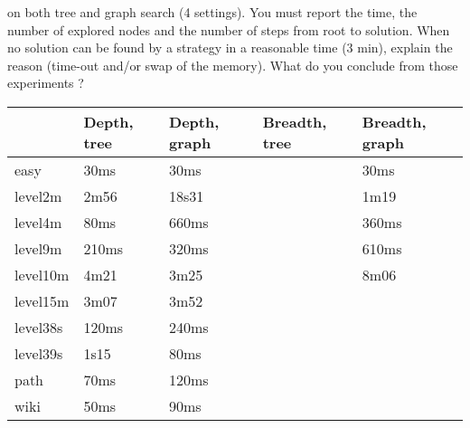 \begin{enumerate}
        on both tree and graph search (4 settings). You must report the
        time, the number of explored nodes and the number of steps from
        root to solution. When no solution can be found by a strategy in
        a reasonable time (3 min), explain the reason (time-out and/or
        swap of the memory). What do you conclude from those experiments
        ?
	\begin{framed}
	  \begin{tabular}{l|l|l|l|l}
	    & Depth, tree & Depth, graph & Breadth, tree & Breadth, graph \\
	    \hline
	    easy & 30ms & 30ms &  & 30ms \\
	    level2m & 2m56 & 18s31 & & 1m19 \\
	    level4m & 80ms & 660ms & & 360ms \\
	    level9m & 210ms & 320ms & & 610ms \\
	    level10m & 4m21 & 3m25 & & 8m06\\
	    level15m & 3m07 & 3m52 & & \\
	    level38s & 120ms & 240ms & & \\
	    level39s & 1s15& 80ms & & \\
	    path & 70ms & 120ms & & \\
	    wiki & 50ms & 90ms & & \\
	  \end{tabular}
	\end{framed}

\end{enumerate}
